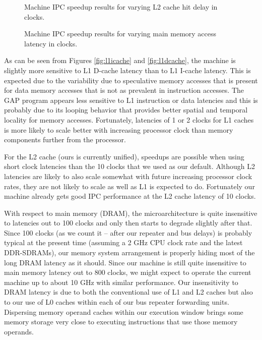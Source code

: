 \documentclass[10pt,dvips]{article}
\begin{document}
%
\begin{figure}
\centering
{}
\caption{Machine IPC speedup results for varying 
L2 cache hit delay in clocks.}
\label{fig:l2cache}
\end{figure}
%
\begin{figure}
\centering
{}
\caption{Machine IPC speedup results for varying 
main memory access latency in clocks.}
\label{fig:dram}
\end{figure}
%
As can be seen from Figures \ref{fig:l1icache} and \ref{fig:l1dcache},
the machine is slightly more sensitive to L1 D-cache latency
than to L1 I-cache latency.  This is expected due to the
variability due to speculative memory accesses that is present for 
data memory accesses
that is not as prevalent in instruction accesses.
The GAP program appears less sensitive to L1 instruction or
data latencies and this is probably due to its looping
behavior that provides better spatial and temporal locality
for memory accesses.  Fortunately, latencies of 1 or 2 clocks
for L1 caches is more likely to scale better with increasing
processor clock than memory components further from the processor.

For the L2 cache (ours is currently unified), speedups are
possible when using short clock latencies than the 10 clocks that
we used as our default.
Although L2 latencies are likely to also scale somewhat
with future increasing processor clock rates, they are not likely
to scale as well as L1 is expected to do.
Fortunately our machine already gets good IPC performance
at the L2 cache latency of 10 clocks.

With respect to main memory (DRAM), the microarchitecture
is quite insensitive to latencies out to 100 clocks and
only then starts to degrade slightly after that.  
Since 100 clocks
(as we count it -- after our repeater and bus delays)
is probably typical at the present time (assuming a 2 GHz
CPU clock rate and the latest DDR-SDRAMs), our memory system
arrangement is properly hiding most of the long DRAM latency as it
should.  Since our machine is still quite insensitive to
main memory latency out to 800 clocks, we might expect to
operate the current machine up to about 10 GHz with similar performance.
Our insensitivity to DRAM latency is due to both the conventional
use of L1 and L2 caches but also to our use of L0 caches
within each of our bus repeater forwarding units.
Dispersing memory operand caches within our execution window
brings some memory storage very close to executing instructions
that use those memory operands.
%
%
\end{document}
